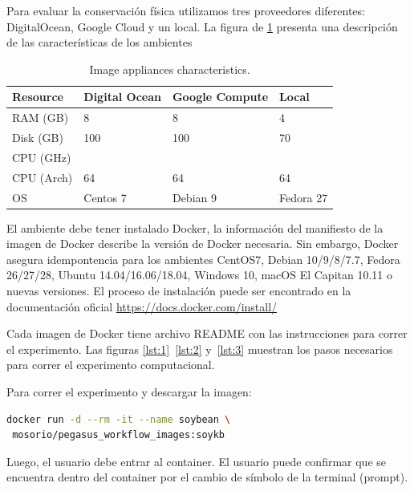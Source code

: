 Para evaluar la conservación física utilizamos tres proveedores diferentes: DigitalOcean, Google Cloud y un local. La figura de \ref{image-env} presenta una descripción de las características de los ambientes    

\begin{table}[]
\centering
\begin{tabular}{|l|l|l|l|}
\hline
Resource   & Digital Ocean & Google Compute & Local     \\ \hline
RAM (GB)   & 8             & 8              & 4         \\ \hline
Disk (GB)  & 100           & 100            & 70        \\ \hline
CPU (GHz)  &               &                &           \\ \hline
CPU (Arch) & 64            & 64             & 64        \\ \hline
OS         & Centos 7      & Debian 9       & Fedora 27 \\ \hline
\end{tabular}
\caption{Image appliances characteristics.}
\label{image-env}
\end{table}

El ambiente debe tener instalado Docker, la información del manifiesto de la imagen de Docker describe la versión de Docker necesaria. Sin embargo, Docker asegura idempontencia para los ambientes CentOS7, Debian 10/9/8/7.7, Fedora 26/27/28, Ubuntu 14.04/16.06/18.04, Windows 10, macOS El Capitan 10.11 o nuevas versiones. El proceso de instalación puede ser encontrado en la documentación oficial \url{https://docs.docker.com/install/}

Cada imagen de Docker tiene archivo README con las instrucciones para correr el experimento. Las figuras \ref{lst:1}~\ref{lst:2} y~\ref{lst:3}  muestran los pasos necesarios para correr el experimento computacional. 

Para correr el experimento y descargar la imagen:

\begin{lstlisting}[caption={Descargar y correr la imagen disponible en DockerHub mosorio/pegasus\_workflow\_images:soykb},label={lst:1},language=bash]
docker run -d --rm -it --name soybean \
 mosorio/pegasus_workflow_images:soykb
\end{lstlisting}

Luego, el usuario debe entrar al container. El usuario puede confirmar que se encuentra dentro del container por el cambio de símbolo de la terminal  (prompt).

